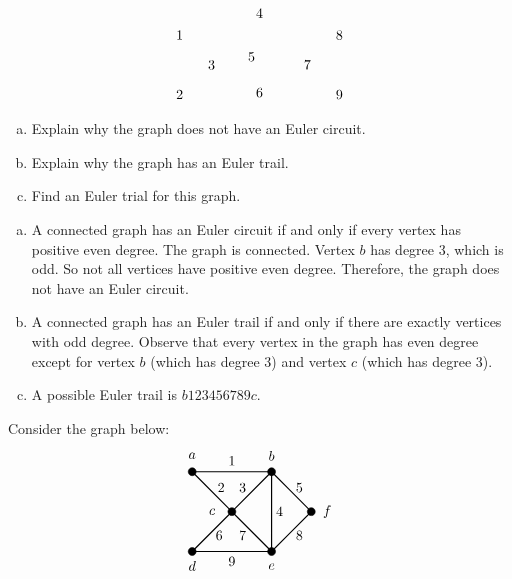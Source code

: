 \documentclass[12pt,letterpaper]{exam}
\begin{document}
\begin{questions}
\[\begin{tikzpicture}
	\node at (-1,1.75) {$1$};
	\node at (-1,0.25) {$2$};
	\node at (-0.2,1) {$3$};
	\node at (1,2.3) {$4$};
	\node at (0.8,1.2) {$5$};
	\node at (1,0.3) {$6$};
	\node at (2.2,1) {$7$};
	\node at (3,1.75) {$8$};
	\node at (3,0.25) {$9$};
	\end{tikzpicture}
	\]

\begin{enumerate}[(a)]
\item Explain why the graph does not have an Euler circuit. 
\item Explain why the graph has an Euler trail. 
\item Find an Euler trial for this graph. 
\end{enumerate} \pspace

\sol 
\begin{enumerate}[(a)]
\item A connected graph has an Euler circuit if and only if every vertex has positive even degree. The graph is connected. Vertex $b$ has degree 3, which is odd. So not all vertices have positive even degree. Therefore, the graph does not have an Euler circuit. \pspace

\item A connected graph has an Euler trail if and only if there are exactly vertices with odd degree. Observe that every vertex in the graph has even degree except for vertex $b$ (which has degree 3) and vertex $c$ (which has degree 3). \pspace

\item A possible Euler trail is $b123456789c$.
\end{enumerate}



\newpage
\question[10] Consider the graph below:
	\[
	\begin{tikzpicture}
	\draw[line width=0.03cm] (2,2) -- (3,1) -- (2,0) -- (2,2) -- (0,2) -- (1,1) -- (0,0) -- (2,0) -- (1,1) -- (2,2);
	
	\draw[fill=black] (0,0) circle (0.1);
	\draw[fill=black] (2,0) circle (0.1);
	\draw[fill=black] (0,2) circle (0.1);
	\draw[fill=black] (2,2) circle (0.1);
	\draw[fill=black] (1,1) circle (0.1);
	\draw[fill=black] (3,1) circle (0.1);
	
	\node at (0,2.4) {$a$};
	\node at (2,2.4) {$b$};
	\node at (0.5,1) {$c$};
	\node at (0,-0.36) {$d$};
	\node at (2,-0.38) {$e$};
	\node at (3.4,1) {$f$};
	
	\node at (1,2.27) {$1$};
	\node at (0.73,1.6) {$2$};
	\node at (1.27,1.6) {$3$};
	\node at (2.2,1) {$4$};
	\node at (2.7,1.6) {$5$};
	\node at (0.68,0.4) {$6$};
	\node at (1.27,0.4) {$7$};
	\node at (2.7,0.4) {$8$};
	\node at (1,-0.25) {$9$};
	\end{tikzpicture}
	\]


\end{questions}
\end{document}
